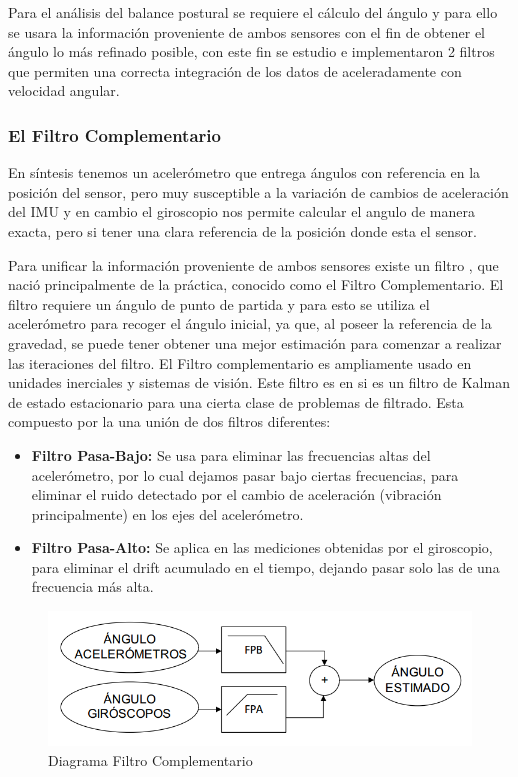 \documentclass[12pt,a4paper]{article}
\begin{document}
Para el análisis del balance postural se requiere el cálculo del ángulo y para ello se usara la información proveniente de ambos sensores con el fin de obtener el ángulo lo más refinado posible, con este fin se estudio e implementaron 2 filtros que permiten una correcta integración de los datos de aceleradamente con velocidad angular.

\subsubsection{El Filtro Complementario}

En síntesis tenemos un acelerómetro que entrega ángulos con referencia en la posición del sensor, pero muy susceptible a la variación de cambios de aceleración del IMU y en cambio el giroscopio nos permite calcular el angulo de manera exacta, pero si tener una clara referencia de la posición donde esta el sensor. 

Para unificar la información proveniente de ambos sensores existe un filtro , que nació principalmente de la práctica, conocido como el Filtro Complementario.
El filtro requiere un ángulo de punto de partida y para esto se utiliza el acelerómetro para recoger el ángulo inicial, ya que, al poseer la referencia de la gravedad, se puede tener obtener una mejor estimación para comenzar a realizar las iteraciones del filtro.
\newline
El Filtro complementario es ampliamente usado en unidades inerciales y sistemas de visión. Este filtro es en si es un filtro de Kalman de estado estacionario para una cierta clase de problemas de filtrado.
Esta compuesto por la una unión de dos filtros diferentes:
\begin{itemize}
\item \textbf{Filtro Pasa-Bajo:} Se usa para eliminar las frecuencias altas del acelerómetro, por lo cual dejamos pasar bajo ciertas frecuencias, para eliminar el ruido detectado por el cambio de aceleración (vibración principalmente) en los ejes del acelerómetro.
\item \textbf{Filtro Pasa-Alto:} Se aplica en las mediciones obtenidas por el giroscopio, para eliminar el drift acumulado en el tiempo, dejando pasar solo las de una frecuencia más alta.
\end{itemize}

\begin{figure}[H]
\centering
	\includegraphics[scale=0.5]{images/FiltroComplementario}
	\caption{Diagrama Filtro Complementario}
    \label{fig:diagramafiltrocomplementario}
\end{figure}
\end{document}
